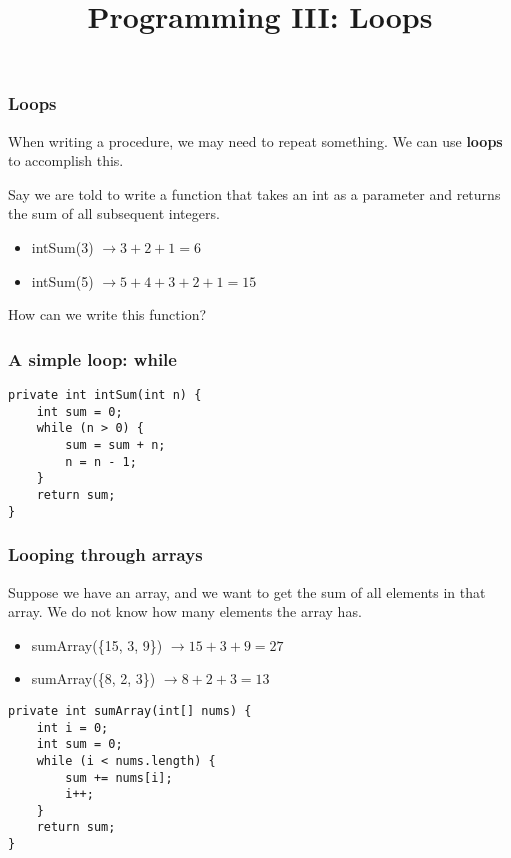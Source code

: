 \documentclass{beamer}
\title{Programming III: Loops}
\date{}
\begin{document}
	
\frame{\titlepage}

\begin{frame}
\frametitle{Loops}
When writing a procedure, we may need to repeat something. We can use \textbf{loops} to accomplish this.
\pause
\medskip

Say we are told to write a function that takes an int as a parameter and returns the sum of all subsequent integers.

\begin{itemize}
\item{intSum(3) $\rightarrow 3 + 2 + 1 = 6$}
\item{intSum(5) $\rightarrow 5 + 4 + 3 + 2 + 1 = 15$}
\end{itemize}

How can we write this function?
\end{frame}

\begin{frame}[fragile]
\frametitle{A simple loop: while}
\begin{lstlisting}[style=basenopause]
private int intSum(int n) {
    int sum = 0;
    while (n > 0) {
        sum = sum + n;
        n = n - 1;
    }
    return sum;
}
\end{lstlisting}
\end{frame}

\begin{frame}[fragile]
\frametitle{Looping through arrays}
Suppose we have an array, and we want to get the sum of all elements in that array. We do not know how many elements the array has.
\begin{itemize}
\item{sumArray(\{15, 3, 9\}) $\rightarrow 15 + 3 + 9 = 27$}
\item{sumArray(\{8, 2, 3\}) $\rightarrow 8 + 2 + 3 = 13$}
\end{itemize}
\pause
\begin{lstlisting}[style=basenopause]
private int sumArray(int[] nums) {
    int i = 0;
    int sum = 0;
    while (i < nums.length) {
        sum += nums[i];
        i++;
    }
    return sum;
}
\end{lstlisting}
\end{frame}
\end{document}
